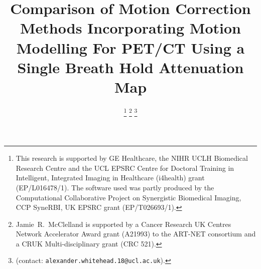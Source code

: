 \documentclass[10pt, twocolumn, twoside, letterpaper]{IEEEtran}
\begin{document}
\title{Comparison of Motion Correction Methods Incorporating Motion Modelling For PET/CT Using a Single Breath Hold Attenuation Map}

\pagestyle{plain}

\author{
    
    
    
        
    \vspace{-1.0cm}

    \thanks{This research is supported by GE Healthcare, the NIHR UCLH Biomedical Research Centre and the UCL EPSRC Centre for Doctoral Training in Intelligent, Integrated Imaging in Healthcare (i4health) grant (EP/L016478/1). The software used was partly produced by the Computational Collaborative Project on Synergistic Biomedical Imaging, CCP SyneRBI, UK EPSRC grant (EP/T026693/1).}%
    \thanks{Jamie~R.~McClelland is supported by a Cancer Research UK Centres Network Accelerator Award grant (A21993) to the ART-NET consortium and a CRUK Multi-disciplinary grant (CRC 521).}%
    \thanks{(contact: \texttt{alexander.whitehead.18@ucl.ac.uk}).}%
}

\maketitle
\IEEEpeerreviewmaketitle
\end{document}
